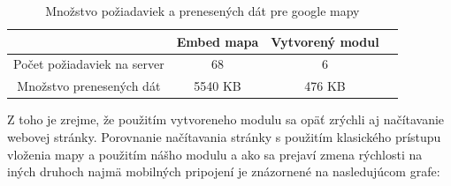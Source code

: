 \begin{table}[H]
  \begin{tabular}{ |c|c|c|c| }
    \hline
    & Embed mapa & Vytvorený modul \\ \hline
    Počet požiadaviek na server & 68 & 6 \\  \hline
    Množstvo prenesených dát  & 5540 KB & 476 KB  \\
    \hline
  \end{tabular}
  \caption[Množstvo požiadaviek a prenesených dát pre google mapy]{Množstvo požiadaviek a prenesených dát pre google mapy}
\end{table}

Z toho je zrejme, že použitím vytvoreneho modulu sa opäť zrýchli aj načítavanie webovej stránky. Porovnanie načítavania stránky s použitím klasického prístupu vloženia mapy a použitím nášho modulu a ako sa prejaví zmena rýchlosti na iných druhoch najmä mobilných pripojení je znázornené na nasledujúcom grafe:

